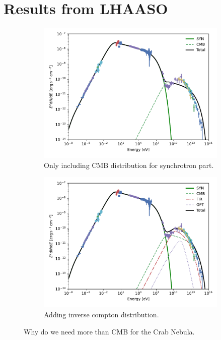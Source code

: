 \documentclass[9pt, mathserif]{beamer}
\begin{document}
    \section{Results from LHAASO}
        \begin{frame}
            \begin{figure}[t]
                \centering
                \begin{subfigure}{0.48\linewidth}
                    \centering
                    \includegraphics[width=\linewidth]{SynIC-BestFitParCMB.pdf}
                    \caption{Only including CMB distribution for synchrotron part.}
                \end{subfigure}
                \begin{subfigure}{0.48\textwidth}
                    \centering
                    \includegraphics[width=\linewidth]{SynIC-BestFitPar1.pdf}
                    \caption{Adding inverse compton distribution.}
                \end{subfigure}
                \caption{Why do we need more than CMB for the Crab Nebula.}
            \end{figure}
        \end{frame}
\end{document}
